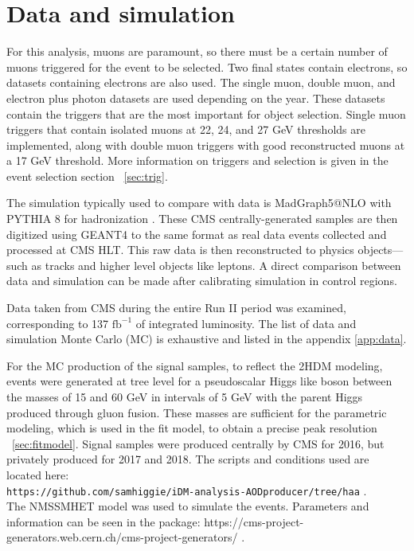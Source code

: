 


\section{Data and simulation}
For this analysis, muons are paramount, so there must be a certain number of muons triggered for the event to be selected. Two final states contain electrons, so datasets containing electrons are also used. The single muon, double muon, and electron plus photon datasets are used depending on the year. These datasets contain the triggers that are the most important for object selection. Single muon triggers that contain isolated muons at 22, 24, and 27 GeV thresholds are implemented, along with double muon triggers with good reconstructed muons at a 17 GeV threshold. More information on triggers and selection is given in the event selection section ~\ref{sec:trig}. 

The simulation typically used to compare with data is MadGraph5@NLO with PYTHIA 8 for hadronization \cite{PYTHIA}. These CMS centrally-generated samples are then digitized using GEANT4 \cite{GEANT4} to the same format as real data events collected and processed at CMS HLT. This raw data is then reconstructed to physics objects---such as tracks and higher level objects like leptons. A direct comparison between data and simulation can be made after calibrating simulation in control regions. 

Data taken from CMS during the entire Run II period was examined, corresponding to 137 $\text{fb}^{-1}$ of integrated luminosity. The list of data and simulation Monte Carlo (MC) is exhaustive and listed in the appendix \ref{app:data}.   

For the MC production of the signal samples, to reflect the 2HDM modeling, events were generated at tree level for a pseudoscalar Higgs like boson between the masses of 15 and 60 GeV in intervals of 5 GeV with the parent Higgs produced through gluon fusion. These masses are sufficient for the parametric modeling, which is used in the fit model, to obtain a precise peak resolution ~\ref{sec:fitmodel}. Signal samples were produced centrally by CMS for 2016, but privately produced for 2017 and 2018. The scripts and conditions used are located here:\\
 \texttt{https://github.com/samhiggie/iDM-analysis-AODproducer/tree/haa} .\\
The NMSSMHET model was used to simulate the events. Parameters and information can be seen in the package:
https://cms-project-generators.web.cern.ch/cms-project-generators/ .



